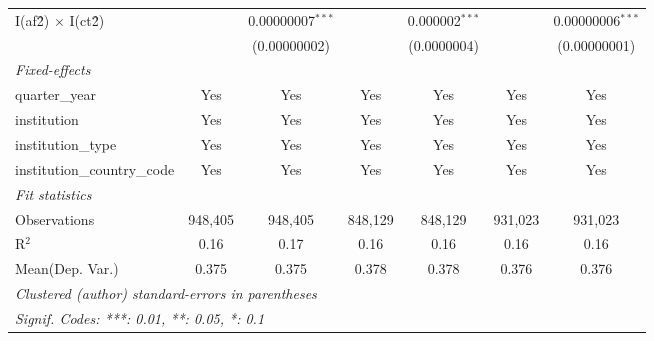 \begin{tabular}{lcccccc}
   I(af\^2) $\times$ I(ct\^2)         &               & 0.00000007$^{***}$ &               & 0.000002$^{***}$ &               & 0.00000006$^{***}$\\   
                                      &               & (0.00000002)       &               & (0.0000004)      &               & (0.00000001)\\   
   \midrule
   \emph{Fixed-effects}\\
   quarter\_year                      & Yes           & Yes                & Yes           & Yes              & Yes           & Yes\\  
   institution                        & Yes           & Yes                & Yes           & Yes              & Yes           & Yes\\  
   institution\_type                  & Yes           & Yes                & Yes           & Yes              & Yes           & Yes\\  
   institution\_country\_code         & Yes           & Yes                & Yes           & Yes              & Yes           & Yes\\  
   \midrule
   \emph{Fit statistics}\\
   Observations                       & 948,405       & 948,405            & 848,129       & 848,129          & 931,023       & 931,023\\  
   R$^2$                              & 0.16          & 0.17               & 0.16          & 0.16             & 0.16          & 0.16\\  
Mean(Dep. Var.) & 0.375 & 0.375 & 0.378 & 0.378 & 0.376 & 0.376 \\
   \midrule \midrule
   \multicolumn{7}{l}{\emph{Clustered (author) standard-errors in parentheses}}\\
   \multicolumn{7}{l}{\emph{Signif. Codes: ***: 0.01, **: 0.05, *: 0.1}}\\
\end{tabular}
\par\endgroup
